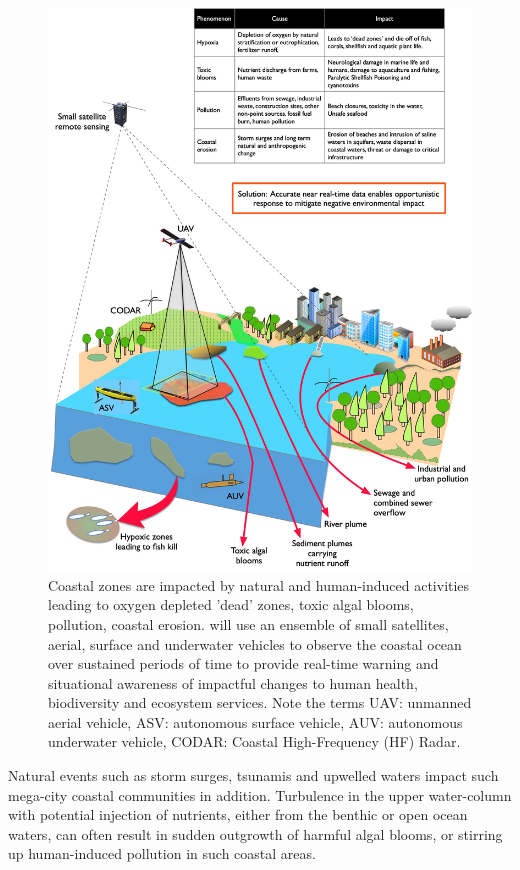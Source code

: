 \documentclass[12pt]{article}
\begin{document}
\begin{figure}[H]
  \centering
  \includegraphics[scale=0.135]{fig/mega-cities-toxic.jpg}
  \caption{Coastal zones are impacted by natural and human-induced
    activities leading to oxygen depleted 'dead' zones, toxic algal
    blooms, pollution, coastal erosion. \pro will use an ensemble of
    small satellites, aerial, surface and underwater vehicles to
    observe the coastal ocean over sustained periods of time to
    provide real-time warning and situational awareness of impactful
    changes to human health, biodiversity and ecosystem services. Note
    the terms UAV: unmanned aerial vehicle, ASV: autonomous surface
    vehicle, AUV: autonomous underwater vehicle, CODAR: Coastal
    High-Frequency (HF) Radar.}
    \label{fig:mega-cities}
\end{figure}

Natural events such as storm surges, tsunamis and upwelled waters
impact such mega-city coastal communities in addition. Turbulence in
the upper water-column with potential injection of nutrients, either
from the benthic or open ocean waters, can often result in sudden
outgrowth of harmful algal blooms, or stirring up human-induced
pollution in such coastal areas.
\end{document}
